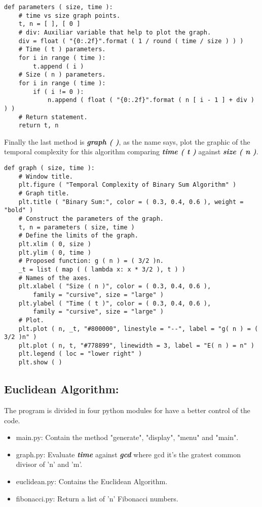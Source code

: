 \documentclass[10pt,a4paper]{article}
\begin{document}
\begin{lstlisting}
def parameters ( size, time ):
    # time vs size graph points.
    t, n = [ ], [ 0 ]
    # div: Auxiliar variable that help to plot the graph.
    div = float ( "{0:.2f}".format ( 1 / round ( time / size ) ) )
    # Time ( t ) parameters.
    for i in range ( time ):
        t.append ( i )
    # Size ( n ) parameters.
    for i in range ( time ):
        if ( i != 0 ):
            n.append ( float ( "{0:.2f}".format ( n [ i - 1 ] + div ) ) )
    # Return statement.
    return t, n
\end{lstlisting} \hfill 

Finally the last method is {\bfseries\itshape graph ( )}, as the name says, plot the graphic of the temporal complexity for this algorithm comparing {\bfseries\itshape time ( t )} against {\bfseries\itshape size ( n )}. \hfill \break

\begin{lstlisting}
def graph ( size, time ):
    # Window title.
    plt.figure ( "Temporal Complexity of Binary Sum Algorithm" )
    # Graph title.
    plt.title ( "Binary Sum:", color = ( 0.3, 0.4, 0.6 ), weight = "bold" )
    # Construct the parameters of the graph.
    t, n = parameters ( size, time )
    # Define the limits of the graph.
    plt.xlim ( 0, size )
    plt.ylim ( 0, time )
    # Proposed function: g ( n ) = ( 3/2 )n.
    _t = list ( map ( ( lambda x: x * 3/2 ), t ) )
    # Names of the axes.
    plt.xlabel ( "Size ( n )", color = ( 0.3, 0.4, 0.6 ), 
    	family = "cursive", size = "large" )
    plt.ylabel ( "Time ( t )", color = ( 0.3, 0.4, 0.6 ), 
    	family = "cursive", size = "large" )
    # Plot.
    plt.plot ( n, _t, "#800000", linestyle = "--", label = "g( n ) = ( 3/2 )n" )
    plt.plot ( n, t, "#778899", linewidth = 3, label = "E( n ) = n" )
    plt.legend ( loc = "lower right" )
    plt.show ( )
\end{lstlisting} \hfill \break

\pagebreak

\subsection{Euclidean Algorithm:}

The program is divided in four python modules for have a better control of the code. 

\begin{itemize}
\item main.py: Contain the method "generate", "display", "menu" and "main".
\item graph.py: Evaluate {\bfseries{\itshape time}}  against {\bfseries{\itshape gcd}} where gcd it's the gratest common divisor of 'n' and 'm'.
\item euclidean.py: Contains the Euclidean Algorithm.
\item fibonacci.py: Return a list of 'n' Fibonacci numbers.
\end{itemize}
\end{document}
